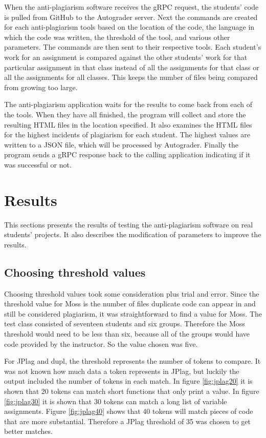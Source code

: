 \documentclass[10pt,journal,compsoc]{IEEEtran}
\begin{document}
		When the anti-plagiarism software receives the gRPC request, the students' code is pulled from GitHub to the Autograder server. Next the commands are created for each anti-plagiarism tools based on the location of the code, the language in which the code was written, the threshold of the tool, and various other parameters. The commands are then sent to their respective tools. Each student's work for an assignment is compared against the other students' work for that particular assignment in that class instead of all the assignments for that class or all the assignments for all classes. This keeps the number of files being compared from growing too large.
			
		The anti-plagiarism application waits for the results to come back from each of the tools. When they have all finished, the program will collect and store the resulting HTML files in the location specified. It also examines the HTML files for the highest incidents of plagiarism for each student. The highest values are written to a JSON file, which will be processed by Autograder. Finally the program sends a gRPC response back to the calling application indicating if it was successful or not.
		
	\section{Results}
	This sections presents the results of testing the anti-plagiarism software on real students' projects. It also describes the modification of parameters to improve the results.
	
		\subsection{Choosing threshold values}
		Choosing threshold values took some consideration plus trial and error. Since the threshold value for Moss is the number of files duplicate code can appear in and still be considered plagiarism, it was straightforward to find a value for Moss. The test class consisted of seventeen students and six groups. Therefore the Moss threshold would need to be less than six, because all of the groups would have code provided by the instructor. So the value chosen was five.
		
		For JPlag and dupl, the threshold represents the number of tokens to compare. It was not known how much data a token represents in JPlag, but luckily the output included the number of tokens in each match. In figure \ref{fig:jplag20} it is shown that 20 tokens can match short functions that only print a value. In figure \ref{fig:jplag30} it is shown that 30 tokens can match a long list of variable assignments. Figure \ref{fig:jplag40} shows that 40 tokens will match pieces of code that are more substantial. Therefore a JPlag threshold of 35 was chosen to get better matches.
		
\end{document}

